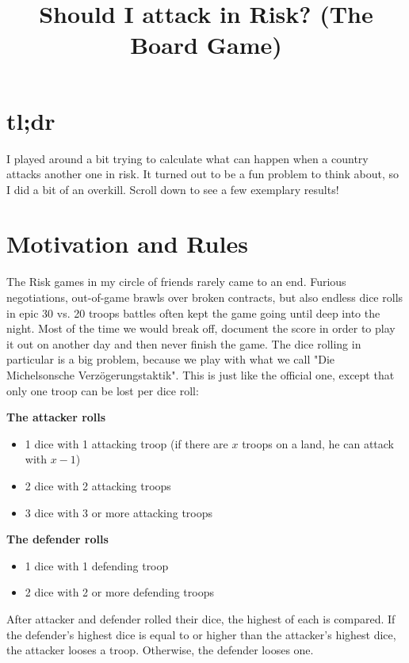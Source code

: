 \documentclass[11pt,a4paper]{article}
\title{Should I attack in Risk? (The Board Game)}
\author{}
\date{}
\begin{document}
    \maketitle


    \section*{tl;dr}
    I played around a bit trying to calculate what can happen when a country attacks another one in risk.
    It turned out to be a fun problem to think about, so I did a bit of an overkill.
    Scroll down to see a few exemplary results!


    \section{Motivation and Rules}
    The Risk games in my circle of friends rarely came to an end.
    Furious negotiations, out-of-game brawls over broken contracts, but also endless dice rolls in epic 30 vs. 20 troops battles often kept the game going until deep into the night.
    Most of the time we would break off, document the score in order to play it out on another day and then never finish the game.
    The dice rolling in particular is a big problem, because we play with what we call "Die Michelsonsche Verzögerungstaktik".
    This is just like the official one, except that only one troop can be lost per dice roll:

    \textbf{The attacker rolls}
    \begin{itemize}
        \item 1 dice with 1 attacking troop (if there are $x$ troops on a land, he can attack with $x-1$)
        \item 2 dice with 2 attacking troops
        \item 3 dice with 3 or more attacking troops
    \end{itemize}

    \textbf{The defender rolls}
    \begin{itemize}
        \item 1 dice with 1 defending troop
        \item 2 dice with 2 or more defending troops
    \end{itemize}

    After attacker and defender rolled their dice, the highest of each is compared.
    If the defender's highest dice is equal to or higher than the attacker's highest dice, the attacker looses a troop.
    Otherwise, the defender looses one.
\end{document}

